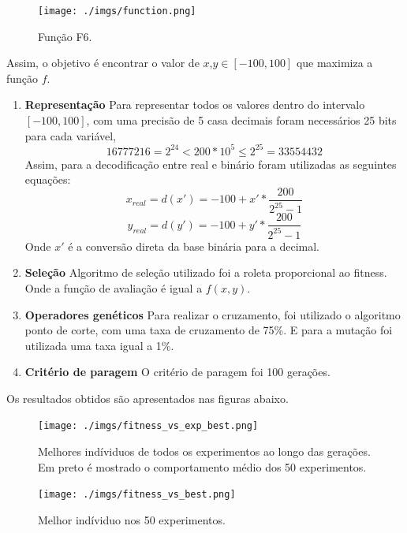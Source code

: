 \documentclass[12pt]{article}
\begin{document}
\begin{figure}[htb]
	\begin{center}
	\texttt{[image: ./imgs/function.png]}
	\caption{Função F6.\label{fig:result}}
	\end{center}
\end{figure}

Assim, o objetivo é encontrar o valor de $x$,$y \in [-100,100]$ que maximiza a função $f$.

\begin{enumerate}[\textbf{(i)}]
	\item \textbf{Representação}
		\subitem Para representar todos os valores dentro do intervalo $[-100,100]$, com uma precisão
		de 5 casa decimais foram necessários 25 bits para cada variável,
		$$16777216 = 2^{24} < 200*10^5 \leq 2^{25} = 33554432$$
		\subitem Assim, para a decodificação entre real e binário foram utilizadas as seguintes equações:
		$$x_{real} = d(x') =  -100 + x' * \frac{200}{2^{25} - 1}$$
		$$y_{real} = d(y') =  -100 + y' * \frac{200}{2^{25} - 1}$$
		\subitem Onde $x'$ é a conversão direta da base binária para a decimal.

	\item \textbf{Seleção}
		\subitem Algoritmo de seleção utilizado foi a roleta proporcional ao fitness. Onde a função de
		avaliação é igual a $f(x,y)$.
	\item \textbf{Operadores genéticos}
		\subitem Para realizar o cruzamento, foi utilizado o algoritmo ponto de corte, com uma taxa de 
		cruzamento de 75\%. E para a mutação foi utilizada uma taxa igual a 1\%.
	\item \textbf{Critério de paragem}
		\subitem O critério de paragem foi 100 gerações.
\end{enumerate}

Os resultados obtidos são apresentados nas figuras abaixo.

\begin{figure}[htb]
		\centering
		\texttt{[image: ./imgs/fitness\_vs\_exp\_best.png]}
		\caption{Melhores indíviduos de todos os experimentos ao longo das gerações.
		Em preto é mostrado o comportamento médio dos 50 experimentos.}
\end{figure}

\begin{figure}[htb]
	\centering
	\texttt{[image: ./imgs/fitness\_vs\_best.png]}
	\caption{Melhor indíviduo nos 50 experimentos.}
\end{figure}
\end{document}

